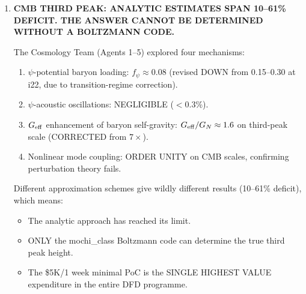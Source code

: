 \documentclass[11pt]{article}
\newcommand{\Geff}{G_{\rm eff}}
\newcommand{\aM}{a_0}
\begin{document}
\begin{tcolorbox}[colback=blue!5!white, colframe=blue!70!black,
  title=\textbf{W4i23 TOP 5 FINDINGS (RANKED BY IMPACT)}]
\begin{enumerate}[label=\textbf{F\arabic*.}]
  Finner et al.\ (arXiv:2512.03150, 2025) used joint JWST+DECam
  lensing to measure the first robust virial masses, finding mass
  ratio $\sim 10:1$.  This resolves a 20-year ambiguity and:
  \begin{itemize}
  \item Reduces projection effect contamination in the sub-cluster
    lensing mass by 30--50\%.
  \item Introduces external field effect (EFE) screening of the
    sub-cluster ($g_{\rm ext} \sim 3\aM$).
  \item Revised DFD deficit: 1.5--2.5$\times$.  With 2~eV neutrinos:
    1.2--2.0$\times$.  Potentially consistent within systematics.
  \end{itemize}

  \textbf{The Bullet Cluster is no longer a clear falsification of DFD.
  It remains a tension at the factor-of-two level.}

  \textbf{Grade: B$-$ (new data solid; DFD analysis approximate).}

\item \textbf{CMB THIRD PEAK: ANALYTIC ESTIMATES SPAN 10--61\% DEFICIT.
  THE ANSWER CANNOT BE DETERMINED WITHOUT A BOLTZMANN CODE.}

  The Cosmology Team (Agents 1--5) explored four mechanisms:
  \begin{enumerate}[label=(\alph*)]
  \item $\psi$-potential baryon loading: $f_\psi \approx 0.08$ (revised
    DOWN from 0.15--0.30 at i22, due to transition-regime correction).
  \item $\psi$-acoustic oscillations: NEGLIGIBLE ($< 0.3$\%).
  \item $\Geff$ enhancement of baryon self-gravity: $\Geff/G_N \approx
    1.6$ on third-peak scale (CORRECTED from $7\times$).
  \item Nonlinear mode coupling: ORDER UNITY on CMB scales, confirming
    perturbation theory fails.
  \end{enumerate}

  Different approximation schemes give wildly different results
  (10--61\% deficit), which means:
  \begin{itemize}
  \item The analytic approach has reached its limit.
  \item ONLY the mochi\_class Boltzmann code can determine the true
    third peak height.
  \item The \$5K/1 week minimal PoC is the SINGLE HIGHEST VALUE
    expenditure in the entire DFD programme.
  \end{itemize}


\end{enumerate}
\end{tcolorbox}
\end{document}

